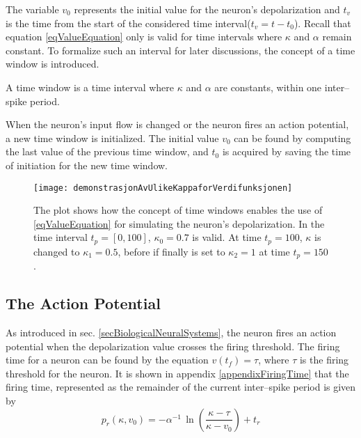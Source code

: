 	
		The variable $v_0$ represents the initial value for the neuron's depolarization and $t_v$ is the time from the start of the considered time interval\mbox{($t_v = t - t_0$)}.
		Recall that equation \ref{eqValueEquation} only is valid for time intervals where $\kappa$ and $\alpha$ remain constant.
		To formalize such an interval for later discussions, the concept of a time window is introduced. %
		\begin{mydef}
			A time window is a time interval where $\kappa$ and $\alpha$ are constants, within one inter--spike period.
			\label{defTimeWindow}
		\end{mydef}
		When the neuron's input flow is changed or the neuron fires an action potential, a new time window is initialized.
		The initial value $v_0$ can be found by computing the last value of the previous time window, and $t_0$ is acquired by saving the time of initiation for the new time window.


\begin{figure}[htb!p]
    \centering
    \texttt{[image: demonstrasjonAvUlikeKappaforVerdifunksjonen]}
 	  \caption{
			The plot shows how the concept of time windows enables the use of \eqref{eqValueEquation} for simulating the neuron's depolarization.
			In the time interval $t_p = [0, 100]$, $\kappa_0 = 0.7$ is valid.
			At time $t_p = 100$, $\kappa$ is changed to $\kappa_1 = 0.5$, before if finally is set to $\kappa_2 = 1$ at time $t_p = 150$.
			}
\end{figure}

	\subsection{The Action Potential}
	\label{ssecTheActionPotential}
	As introduced in sec. \ref{secBiologicalNeuralSystems}, the neuron fires an action potential when the depolarization value crosses the firing threshold.
	The firing time for a neuron can be found by the equation $v(t_f) = \tau$, where $\tau$ is the firing threshold for the neuron.
	It is shown in appendix \ref{appendixFiringTime} that the firing time, represented as the remainder of the current inter--spike period is given by
\begin{equation}
	p_r(\kappa, v_0)  	= -\alpha^{-1} \, \ln \left( \frac{\kappa - \tau}{\kappa - v_0} \right) + t_r
	\label{eqEstimatedTimeToFiring}
\end{equation}

